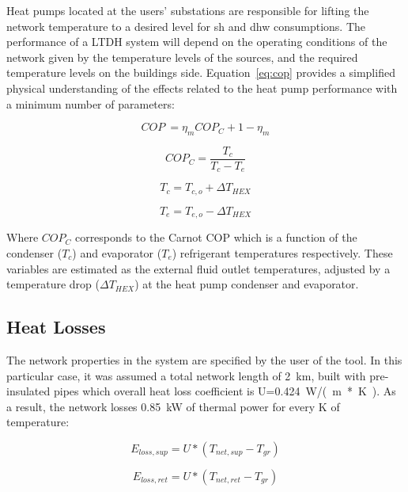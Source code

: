 \documentclass{article}
\begin{document}
Heat pumps located at the users' substations are responsible for lifting the network temperature to a desired level for \gls{sh} and \gls{dhw} consumptions. The performance of a LTDH system will depend on the operating conditions of the network given by the temperature levels of the sources, and the required temperature levels on the buildings side. Equation~\ref{eq:cop} provides a simplified physical understanding of the effects related to the heat pump performance with a minimum number of parameters:

\begin{equation}
\label{eq:cop}
    COP\ = \eta_{m} COP_{C} +1 - \eta_{m}
\end{equation}

\begin{equation}
COP_{C}= \frac{T_{c}}{T{_c} - T_{e}} 
\end{equation}

\begin{equation}
T_{c}= T_{c,o} +  \Delta T_{HEX} 
\end{equation}

\begin{equation}
T_{e}=  T_{e,o} -  \Delta T_{HEX} 
\end{equation}

Where $COP_{C}$ corresponds to the Carnot COP\cite{grassi_2018} which is a function of the condenser ($ T_{c}$) and evaporator ($T_{e}$) refrigerant temperatures respectively. These variables are estimated as the external fluid outlet temperatures, adjusted by a temperature drop ($\Delta T_{HEX}$) at the heat pump condenser and evaporator.  

\subsection{Heat Losses}

The network properties in the system are specified by the user of the tool. In this particular case, it was assumed a total network length of \SI{2}{\km}, built with pre-insulated pipes which overall heat loss coefficient is U=\SI{0.424}{\W/(m*K)}. As a result, the network losses \SI{0.85}{\kW} of thermal power for every \degree K of temperature: 

\begin{equation}
E_{loss,sup}= U*(T_{net,sup} - T_{gr}) 
\end{equation}

\begin{equation}
E_{loss,ret}= U*(T_{net,ret} - T_{gr}) 
\end{equation}
\end{document}
